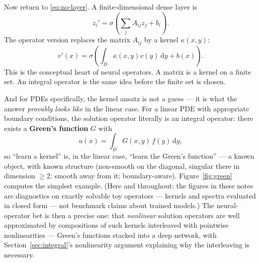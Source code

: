 \documentclass[10pt,a4paper]{article}
\newcommand{\dd}{\mathrm{d}}
\begin{document}
Now return to \eqref{eq:no-layer}. A finite-dimensional dense layer is
\[
  z_i' = \sigma\!\left(\sum_j A_{ij}z_j + b_i\right).
\]
The operator version replaces the matrix $A_{ij}$ by a kernel
$\kappa(x,y)$:
\[
  v'(x) = \sigma\!\left(\int_D \kappa(x,y)v(y)\,\dd y + b(x)\right).
\]
This is the conceptual heart of neural operators. A matrix is a kernel on a
finite set. An integral operator is the same idea before the finite set is
chosen.

And for PDEs specifically, the kernel ansatz is not a guess --- it is what
the answer \emph{provably looks like} in the linear case. For a linear PDE
with appropriate boundary conditions, the solution operator literally is an
integral operator: there exists a \textbf{Green's function} $G$ with
\begin{equation}
  u(x) = \int_D G(x,y)\, f(y)\, \dd y ,
\label{eq:green}
\end{equation}
so ``learn a kernel'' is, in the linear case, ``learn the Green's
function'' --- a known object, with known structure (non-smooth on the
diagonal, singular there in dimension $\geq 2$; smooth away from it;
boundary-aware). Figure~\ref{fig:green}
computes the simplest example. (Here and throughout: the figures in these
notes are diagnostics on exactly solvable toy operators --- kernels and
spectra evaluated in closed form --- not benchmark claims about trained
models.) The neural-operator bet is then a precise
one: that \emph{nonlinear} solution operators are well approximated by
compositions of such kernels interleaved with pointwise nonlinearities ---
Green's functions stacked into a deep network, with
Section~\ref{sec:integral}'s nonlinearity argument explaining why the
interleaving is necessary.
\end{document}
